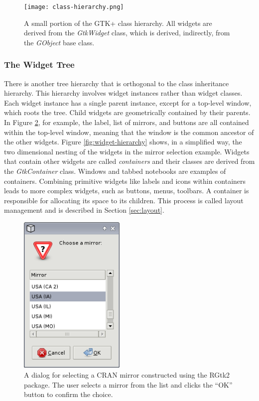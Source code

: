 \documentclass[article]{jss}
\begin{document}
\begin{figure}
\begin{center}
\texttt{[image: class-hierarchy.png]}
\caption{\label{fig:class-hierarchy}A small portion of the GTK+ class hierarchy. 
All widgets are derived from the \emph{GtkWidget} class, which is derived, 
indirectly, from the \emph{GObject} base class.}
\end{center}
\end{figure}

\subsubsection{The Widget Tree}

There is another tree hierarchy that is orthogonal to the 
class inheritance hierarchy. This hierarchy involves widget instances rather
than widget classes. Each widget instance has a single parent instance, except
for a top-level window, which roots the tree. Child widgets are geometrically
contained by their parents. In Figure \ref{fig:cran-mirror}, 
for example, the label, list of mirrors, and buttons are all contained within the 
top-level window, meaning that the window is the common ancestor of the other widgets.
Figure \ref{fig:widget-hierarchy} shows, in a simplified way, the two dimensional
nesting of the widgets in the mirror selection example. Widgets that contain 
other widgets are called \emph{containers} and their classes are derived from 
the \emph{GtkContainer} class. Windows and tabbed notebooks are examples of containers.
Combining primitive widgets like labels and icons within containers
leads to more complex widgets, such as buttons, menus, toolbars. A container is 
responsible for allocating its space to its children. This process is called
layout management and is described in Section \ref{sec:layout}.

\begin{figure}[bhp]
\begin{center}
\includegraphics[width=2in]{cran-mirror.png}
\caption{\label{fig:cran-mirror}A dialog for selecting a CRAN mirror constructed
using the RGtk2 package. The user selects a mirror from the list and clicks the
``OK'' button to confirm the choice.}
\end{center}
\end{figure}
\end{document}
